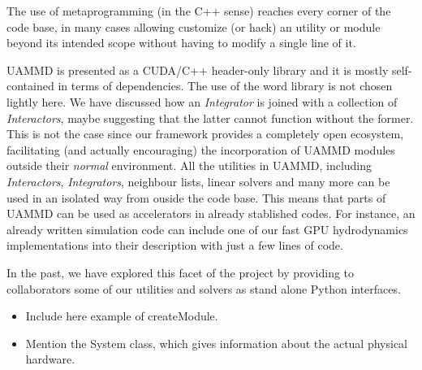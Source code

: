 \documentclass[ twoside,openright,titlepage,numbers=noenddot,%
headinclude,footinclude,cleardoublepage=empty,abstract=on,
BCOR=5mm,paper=a4,fontsize=11pt, dvipsnames
]{scrreprt}
\newcommand{\uammd}{\gls{UAMMD}\xspace}
\newcommand{\gpu}{\gls{GPU}\xspace}
\begin{document}
The use of metaprogramming (in the C++ sense) reaches every corner of the code base, in many cases allowing customize (or hack) an utility or module beyond its intended scope without having to modify a single line of it.

\uammd is presented as a CUDA/C++ header-only library and it is mostly self-contained in terms of dependencies. The use of the word library is not chosen lightly here. We have discussed how an \emph{Integrator} is joined with a collection of \emph{Interactors}, maybe suggesting that the latter cannot function without the former. This is not the case since our framework provides a completely open ecosystem, facilitating (and actually encouraging) the incorporation of \uammd modules outside their \emph{normal} environment.
All the utilities in \uammd, including \emph{Interactors}, \emph{Integrators}, neighbour lists, linear solvers and many more can be used in an isolated way from ouside the code base. This means that parts of \uammd can be used as accelerators in already stablished codes. For instance, an already written simulation code can include one of our fast \gpu hydrodynamics implementations into their description with just a few lines of code.

In the past, we have explored this facet of the project by providing to collaborators some of our utilities and solvers as stand alone Python interfaces.

\begin{itemize}
\item Include here example of createModule.
\item Mention the System class, which gives information about the actual physical hardware.
\end{itemize}
\end{document}
